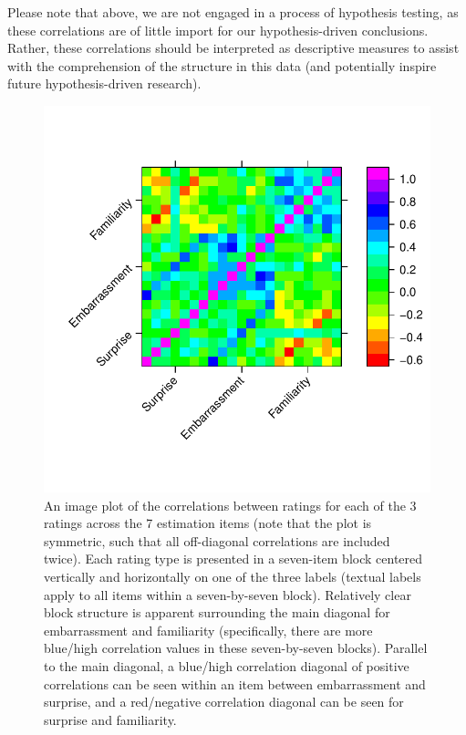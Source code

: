 Please note that above, we are not engaged in a process of hypothesis testing,
as these correlations are of little import for our hypothesis-driven
conclusions. Rather, these correlations should be interpreted as descriptive
measures to assist with the comprehension of the structure in this data (and
potentially inspire future hypothesis-driven research).

\begin{figure}
    \centering
    \includegraphics{CCO-prondi-surp-corr.pdf}
    \caption{An image plot of the correlations between ratings for each of the 3
        ratings across the 7 estimation items (note that the plot is symmetric,
        such that all off-diagonal correlations are included twice). Each rating
        type is presented in a seven-item block centered vertically and
        horizontally on one of the three labels (textual labels apply to all
        items within a seven-by-seven block).  Relatively clear block structure
        is apparent surrounding the main diagonal for embarrassment and
        familiarity (specifically, there are more blue/high correlation values
        in these seven-by-seven blocks).  Parallel to the main diagonal, a
        blue/high correlation diagonal of positive correlations can be seen
        within an item between embarrassment and surprise, and a red/negative
        correlation diagonal can be seen for surprise and familiarity.}
    \label{fig:CCO-prondi-surp-corr}
\end{figure}

